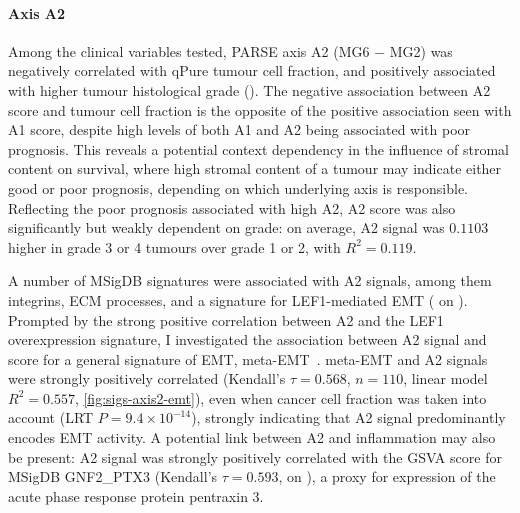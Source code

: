 \documentclass[dissertation.tex]{subfiles}
\begin{document}
\paragraph{Axis A2}
Among the clinical variables tested, \gls{PARSE} axis A2 (MG6 $-$ MG2) was negatively correlated with qPure tumour cell fraction, and positively associated with higher tumour histological grade ().  The negative association between A2 score and tumour cell fraction is the opposite of the positive association seen with A1 score, despite high levels of both A1 and A2 being associated with poor prognosis.  This reveals a potential context dependency in the influence of stromal content on survival, where high stromal content of a tumour may indicate either good or poor prognosis, depending on which underlying axis is responsible.    Reflecting the poor prognosis associated with high A2, A2 score was also significantly but weakly dependent on grade: on average, A2 signal was $0.1103$ higher in grade 3 or 4 tumours over grade 1 or 2, with $R^2 = 0.119$.

A number of \gls{MSigDB} signatures were associated with A2 signals, among them integrins, \gls{ECM} processes, and a signature for LEF1-mediated \gls{EMT} ( on ).  Prompted by the strong positive correlation between A2 and the LEF1 overexpression signature, I investigated the association between A2 signal and score for a general signature of \gls{EMT}, meta-EMT~\cite{Groger2012}.  meta-EMT and A2 signals were strongly positively correlated (Kendall's $\tau = 0.568$, $n = 110$, linear model $R^2 = 0.557$, \ref{fig:sigs-axis2-emt}), even when cancer cell fraction was taken into account (LRT $P = 9.4 \times 10^{-14}$), strongly indicating that A2 signal predominantly encodes \gls{EMT} activity.  A potential link between A2 and inflammation may also be present: A2 signal was strongly positively correlated with the \gls{GSVA} score for \gls{MSigDB} GNF2\_PTX3 (Kendall's $\tau = 0.593$,  on ), a proxy for expression of the acute phase response protein pentraxin 3.
\end{document}
